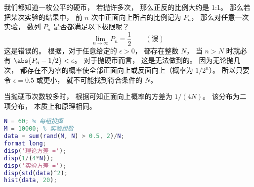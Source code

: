 
\begin{issues}
\issueDraft
\end{issues}


我们都知道一枚公平的硬币， 若抛许多次， 那么正反的比例大约是 1:1。 那么若把某次实验的结果中， 前 $n$ 次中正面向上所占的比例记为 $P_n$， 那么对任意一次实验， 数列 $P_n$ 是否都满足以下极限呢？
\begin{equation}
\lim_{n\to\infty} P_n = \frac{1}{2} \qquad (\text{误})~
\end{equation}
这是错误的。 根据，对于任意给定的 $\epsilon > 0$， 都存在整数 $N$， 当 $n>N$ 时就必有 $\abs{P_n -1/2} < \epsilon$。 对于抛硬币而言， 这是无法做到的。 因为无论抛几次， 都存在不为零的概率使全部正面向上或反面向上（概率为 $1/2^n$）。 所以只要令 $\epsilon = 0.5$ 或更小， 就不可能找到符合条件的 $N$。

当抛硬币次数较多时， 根据可知正面向上概率的方差为 $1/(4N)$。 该分布为二项分布， 本质上和原理相同。

\begin{lstlisting}[language=matlab]
N = 60; % 每组投掷
M = 10000; % 实验组数
data = sum(rand(M, N) > 0.5, 2)/N;
format long;
disp('理论方差 =');
disp(1/(4*N));
disp('实验方差 =');
disp(std(data)^2);
hist(data, 20);
\end{lstlisting}
